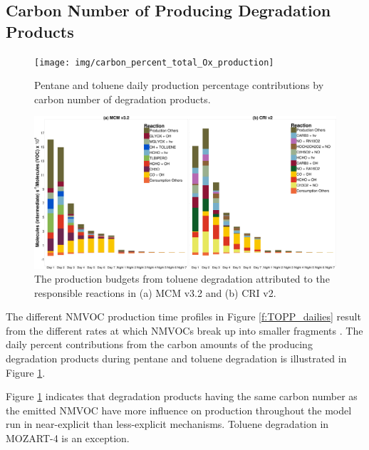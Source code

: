 
\subsection{Carbon Number of  Producing Degradation Products} \label{ss:c_number} %

\begin{figure}
    \begin{center}
        \texttt{[image: img/carbon\_percent\_total\_Ox\_production]}
    \end{center}
    \caption{Pentane and toluene daily  production percentage contributions by carbon number of degradation products.}
    \label{f:percent_carbon}
\end{figure}

\begin{figure}
    \begin{center}
        \includegraphics[width=\textwidth]{img/TOL_MCM_CRI_HO2x_intermediates}
        \caption{The  production budgets from toluene degradation attributed to the responsible reactions in (a) MCM v3.2 and (b) CRI v2.}
        \label{f:toluene_HO2x}
    \end{center}
\end{figure} 

The different NMVOC  production time profiles in Figure \ref{f:TOPP_dailies} result from the different rates at which NMVOCs break up into smaller fragments \citep{Butler:2011}.
The daily percent contributions from the carbon amounts of the  producing degradation products during pentane and toluene degradation is illustrated in Figure \ref{f:percent_carbon}.

Figure \ref{f:percent_carbon} indicates that degradation products having the same carbon number as the emitted NMVOC have more influence on  production throughout the model run in near-explicit than less-explicit mechanisms.
Toluene degradation in MOZART-4 is an exception.

